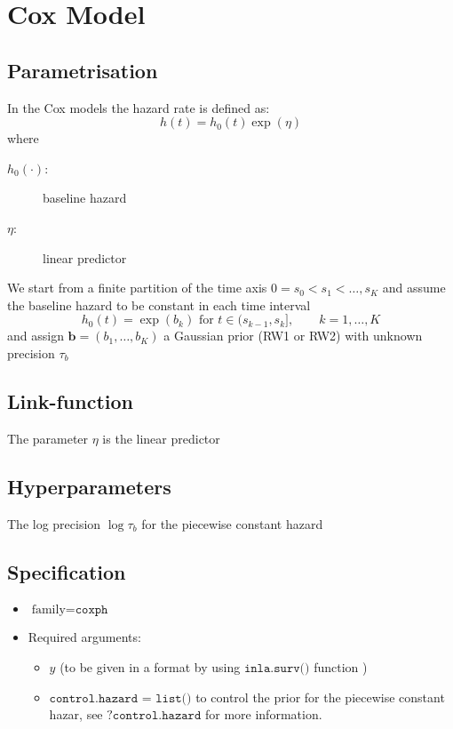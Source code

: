 \documentclass[a4paper,11pt]{article}
\begin{document}
\section*{Cox Model}

\subsection*{Parametrisation}

In the Cox models the hazard rate is defined as:
\begin{displaymath}
    h(t) = h_{0}(t)\exp(\eta)
\end{displaymath}
where
\begin{description}
    \item[$h_{0}(\cdot)$:]  baseline hazard
\item[$\eta$:] linear predictor
\end{description}

We start from a finite partition of the time axis
$0=s_{0}<s_{1}<\dots,s_{K}$
and assume the baseline hazard to be constant in each time interval 
\[
h_{0}(t) = \exp(b_{k})\mbox{ for }t\in(s_{k-1},s_{k}],\qquad k=1,\dots,K
\]
and assign $\mathbf{b} = (b_{1},\dots,b_{K})$ a Gaussian prior (RW1 or
RW2) with unknown precision $\tau_{b}$
\subsection*{Link-function}

The parameter $\eta$ is the linear predictor

\subsection*{Hyperparameters}

The log precision $\log\tau_{b}$ for the piecewise constant hazard
\subsection*{Specification}

\begin{itemize}
\item $\text{family}=\texttt{coxph}$
\item Required arguments:
    \begin{itemize}
    \item $y$ (to be given in a format by using
        $\texttt{inla.surv()}$ function )
    \item $\texttt{control.hazard = list()}$ to control the prior for
        the piecewise constant hazar, see $\texttt{?control.hazard}$ for
        more information.
\end{itemize}
\end{itemize}
\end{document}
